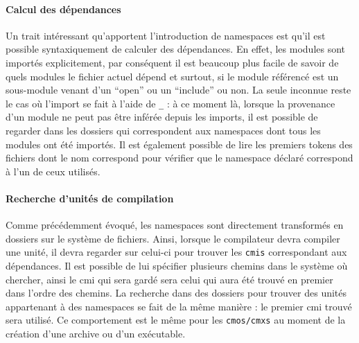 \documentclass[11pt,a4paper]{report}
\begin{document}

\paragraph{Calcul des dépendances}

Un trait intéressant qu'apportent l'introduction de namespaces est qu'il est
possible syntaxiquement de calculer des dépendances. En effet, les modules sont
importés explicitement, par conséquent il est beaucoup plus facile de savoir de
quels modules le fichier actuel dépend et surtout, si le module référencé est un
sous-module venant d'un ``open'' ou un ``include'' ou non. La seule inconnue
reste le cas où l'import se fait à l'aide de \texttt{_} : à ce moment là,
lorsque la provenance d'un module ne peut pas être inférée depuis les imports,
il est possible de regarder dans les dossiers qui correspondent aux namespaces
dont tous les modules ont été importés. Il est également possible de lire les
premiers tokens des fichiers dont le nom correspond pour vérifier que le
namespace déclaré correspond à l'un de ceux utilisés.

\paragraph{Recherche d'unités de compilation}

Comme précédemment évoqué, les namespaces sont directement transformés en
dossiers sur le système de fichiers. Ainsi, lorsque le compilateur devra
compiler une unité, il devra regarder sur celui-ci pour trouver les
\texttt{cmis} correspondant aux dépendances. Il est possible de lui spécifier
plusieurs chemins dans le système où chercher, ainsi le cmi qui sera gardé sera
celui qui aura été trouvé en premier dans l'ordre des chemins. La recherche dans
des dossiers pour trouver des unités appartenant à des namespaces se fait de la
même manière : le premier cmi trouvé sera utilisé. Ce comportement est le même
pour les \texttt{cmos/cmxs} au moment de la création d'une archive ou d'un
exécutable.
\end{document}
